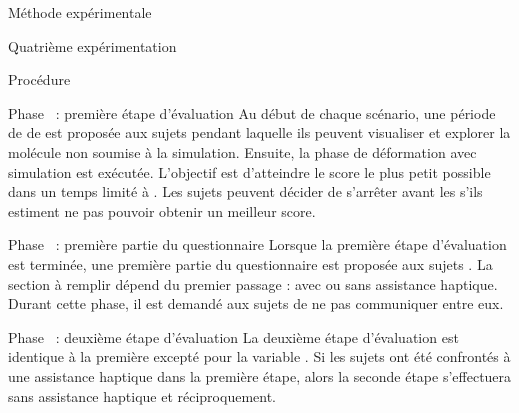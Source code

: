 \documentclass[myfrancais,ngerman,english,french]{mythesis}
\begin{document}
\begin{mychapter}{Méthode expérimentale}
\begin{mysection}{Quatrième expérimentation}
\begin{mysubsection}{Procédure}
\begin{myparagraph}{Phase~ : première étape d'évaluation}
					Au début de chaque scénario, une période de  de \mybrainstorming est proposée aux sujets pendant laquelle ils peuvent visualiser et explorer la molécule non soumise à la simulation.
					Ensuite, la phase de déformation avec simulation est exécutée.
					L'objectif est d'atteindre le score  le plus petit possible dans un temps limité à .
					Les sujets peuvent décider de s'arrêter avant les  s'ils estiment ne pas pouvoir obtenir un meilleur score.
				\end{myparagraph}
				\begin{myparagraph}{Phase~ : première partie du questionnaire}
					Lorsque la première étape d'évaluation est terminée, une première partie du questionnaire est proposée aux sujets .
					La section à remplir dépend du premier passage : avec ou sans assistance haptique.
					Durant cette phase, il est demandé aux sujets de ne pas communiquer entre eux.
				\end{myparagraph}
				\begin{myparagraph}{Phase~ : deuxième étape d'évaluation}
					La deuxième étape d'évaluation est identique à la première excepté pour la variable .
					Si les sujets ont été confrontés à une assistance haptique dans la première étape, alors la seconde étape s'effectuera sans assistance haptique et réciproquement.


\end{myparagraph}
\end{mysubsection}
\end{mysection}
\end{mychapter}
\end{document}
